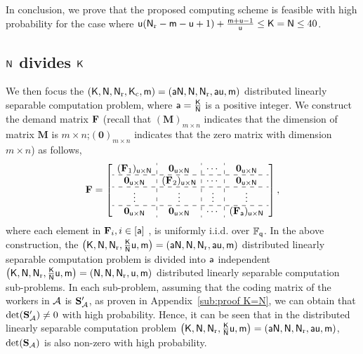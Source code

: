 \documentclass[conference,letterpaper]{IEEEtran}
\begin{document}
In conclusion, we prove that the proposed computing scheme is feasible with high probability for the case where ${\sf u}({\sf N}_{\rm r}-{\sf m}-{\sf u}+1) + \frac{{\sf m}+{\sf u}-1}{{\sf u}}  \leq {\sf K}={\sf N} \leq 40$.

\subsection{\texorpdfstring{${\sf N}$ divides ${\sf K}$}{Nsf divides Ksf}}
\label{sub:proof N divides K}
We then focus the $({\sf K}, {\sf N}, {\sf N}_{\rm r}, {\sf K}_{\rm c}, {\sf m}) = ({\sf a}{\sf N}, {\sf N}, {\sf N}_{\rm r}, {\sf a}{\sf u}, {\sf m})$ distributed linearly separable computation problem, where ${\sf a} = \frac{{\sf K}}{{\sf N}}$ is a positive integer. 
We construct the demand matrix $\bf F$ (recall that $(\mathbf{M})_{m \times n}$ indicates that the dimension of matrix $\mathbf{M}$ is $m \times n$;$(\mathbf{0})_{m \times n}$ indicates that the zero matrix  with dimension  $m \times n$) as follows,
 \begin{align}
 {\bf F}  = \left[\begin{array}{c:c:c:c}
 ({\bf F}_{1})_{\usf \times \Nsf}  & {\bf 0}_{\usf \times \Nsf}  & \cdots & {\bf 0}_{\usf \times \Nsf}   \\ \hdashline
{\bf 0}_{\usf \times \Nsf} &  ({\bf F}_2)_{\usf \times \Nsf}   & \cdots & {\bf 0}_{\usf \times \Nsf}   \\ \hdashline 
 \vdots   & \vdots  &  \vdots& \vdots \\ \hdashline
 {\bf 0}_{\usf \times \Nsf} &   {\bf 0}_{\usf \times \Nsf}    & \cdots &  ({\bf F}_{\asf})_{\usf \times \Nsf} 
 \end{array}
\right], \label{eq:F for N divides K}
 \end{align} 
where each element in ${\bf F}_i, i\in \left[{\sf a} \right]$ , is uniformly i.i.d.  over  $\mathbb{F}_{{\sf q}}$. 
In the above construction, the   $\left(  {\sf K},{\sf N},{\sf N}_{\rm r},  \frac{{\sf K}}{{\sf N}}{\sf u} , {\sf m} \right) = ({\sf a}{\sf N}, {\sf N}, {\sf N}_{\rm r}, {\sf a}{\sf u}, {\sf m})$ distributed linearly separable computation problem is divided into ${\sf a}$ independent   $\left(  {\sf K},{\sf N},{\sf N}_{\rm r},  \frac{{\sf K}}{{\sf N}}{\sf u} , {\sf m} \right) = ({\sf N}, {\sf N}, {\sf N}_{\rm r}, {\sf u}, {\sf m})$ distributed linearly separable computation sub-problems.
In each sub-problem, assuming that the coding matrix of the workers in ${{\cal A}}$ is ${\bf S}'_{{\cal A}}$, as proven in Appendix~\ref{sub:proof K=N}, we can obtain that \( \text{det}({\bf S}'_{{\cal A}}) \neq 0 \) with high probability. 
Hence, it can be seen that in the distributed linearly separable computation problem \( \left( {\sf K}, {\sf N}, {\sf N}_{\rm r}, \frac{{\sf K}}{{\sf N}} {\sf u}, {\sf m} \right) = ({\sf a} {\sf N}, {\sf N}, {\sf N}_{\rm r}, {\sf a} {\sf u}, {\sf m}) \), \( \text{det}({\bf S}_{{\cal A}}) \) is also non-zero with high probability.
\end{document}

